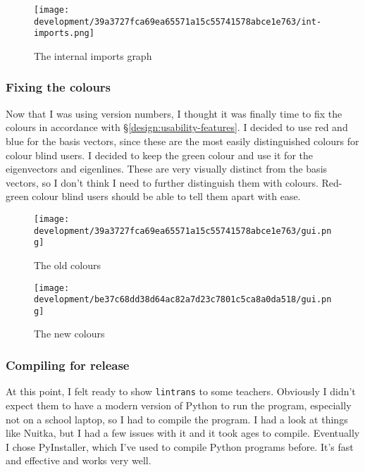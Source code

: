 \documentclass[../development.tex]{subfiles}
\begin{document}

\begin{figure}[H]
	\centering
	\texttt{[image: development/39a3727fca69ea65571a15c55741578abce1e763/int-imports.png]}
	\caption{The internal imports graph}
	\label{fig:development:39a3727fca69ea65571a15c55741578abce1e763:int-imports.png}
\end{figure}

\subsubsection{Fixing the colours\label{development:fumbling-with-semver:fixing-the-colours}}

Now that I was using version numbers, I thought it was finally time to fix the colours in accordance with \S\ref{design:usability-features}. I decided to use red and blue for the basis vectors, since these are the most easily distinguished colours for colour blind users. I decided to keep the green colour and use it for the eigenvectors and eigenlines. These are very visually distinct from the basis vectors, so I don't think I need to further distinguish them with colours. Red-green colour blind users should be able to tell them apart with ease.

\begin{figure}[H]
	\centering
	\texttt{[image: development/39a3727fca69ea65571a15c55741578abce1e763/gui.png]}
	\caption{The old colours}
	\label{fig:development:39a3727fca69ea65571a15c55741578abce1e763:gui.png}
\end{figure}

\begin{figure}[H]
	\centering
	\texttt{[image: development/be37c68dd38d64ac82a7d23c7801c5ca8a0da518/gui.png]}
	\caption{The new colours}
	\label{fig:development:be37c68dd38d64ac82a7d23c7801c5ca8a0da518:gui.png}
\end{figure}

\subsubsection{Compiling for release\label{development:fumbling-with-semver:compiling-for-release}}

At this point, I felt ready to show \texttt{lintrans} to some teachers. Obviously I didn't expect them to have a modern version of Python to run the program, especially not on a school laptop, so I had to compile the program. I had a look at things like Nuitka\cite{nuitka-docs}, but I had a few issues with it and it took ages to compile. Eventually I chose PyInstaller\cite{pyinstaller-4.10-docs}, which I've used to compile Python programs before. It's fast and effective and works very well.
\end{document}
